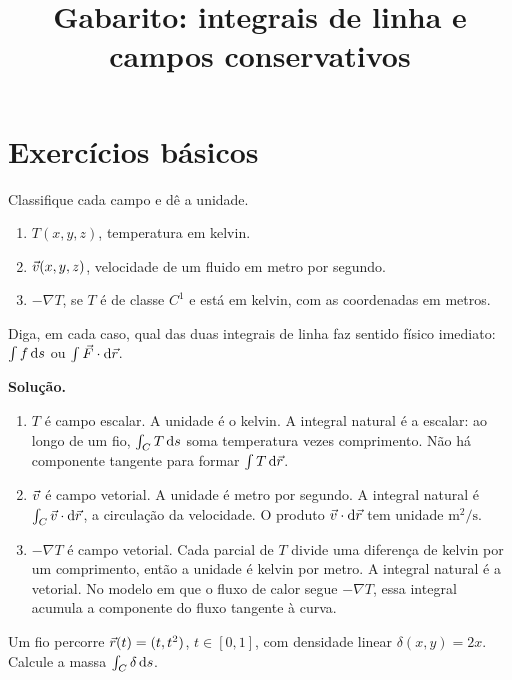 \documentclass[11pt,a4paper]{article}
\title{Gabarito: integrais de linha e campos conservativos}
\author{}
\date{}
\begin{document}
\maketitle
\tableofcontents

\section{Exercícios básicos}

\begin{exercicio}
Classifique cada campo e dê a unidade.
\begin{enumerate}
\item $T(x,y,z)$, temperatura em kelvin.
\item $\vec{v}(x,y,z)$, velocidade de um fluido em metro por segundo.
\item $-\nabla T$, se $T$ é de classe $C^1$ e está em kelvin, com as coordenadas em metros.
\end{enumerate}
Diga, em cada caso, qual das duas integrais de linha faz sentido físico imediato: $\int f\,\mathrm{d} s$ ou $\int\vec{F}\cdot\mathrm{d}\vec{r}$.
\end{exercicio}

\noindent\textbf{Solução.}
\begin{enumerate}
\item $T$ é campo escalar. A unidade é o kelvin. A integral natural é a escalar: ao longo de um fio, $\int_C T\,\mathrm{d} s$ soma temperatura vezes comprimento. Não há componente tangente para formar $\int T\,\mathrm{d}\vec{r}$.
\item $\vec{v}$ é campo vetorial. A unidade é metro por segundo. A integral natural é $\int_C\vec{v}\cdot\mathrm{d}\vec{r}$, a circulação da velocidade. O produto $\vec{v}\cdot\mathrm{d}\vec{r}$ tem unidade $\mathrm{m}^2/\mathrm{s}$.
\item $-\nabla T$ é campo vetorial. Cada parcial de $T$ divide uma diferença de kelvin por um comprimento, então a unidade é kelvin por metro. A integral natural é a vetorial. No modelo em que o fluxo de calor segue $-\nabla T$, essa integral acumula a componente do fluxo tangente à curva.
\end{enumerate}

\begin{exercicio}
Um fio percorre $\vec{r}(t)=(t,t^2)$, $t\in[0,1]$, com densidade linear $\delta(x,y)=2x$. Calcule a massa $\int_C\delta\,\mathrm{d} s$.
\end{exercicio}
\end{document}
